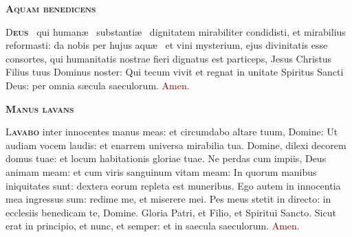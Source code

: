 \documentclass[12pt,a4paper]{scrartcl}
\newcommand{\krzyz}{\textcolor{red}{\raisebox{-1mm}{\scalebox{1.5}{\ding{64}}}}}
\begin{document}
\thispagestyle{empty}

\pagecolor{fondpaille}
\color{darkgreen}

\begin{center}

    \begin{minipage}{0.7\linewidth}

        \vspace*{2.7cm}

        \begin{center}
            \scshape\bfseries\Huge
            Aquam benedicens
        \end{center}

        \vspace*{0.1cm}

        \LARGE\justify

        \lettrine[lines=3]{\color{Maroon}D}{\bfseries\color{Maroon}eus}
        \krzyz~qui human\ae~ substanti\ae~ dignitatem mirabiliter condidisti, et
        mirabilius reformasti: da nobis per hujus aqu\ae~ et vini mysterium,
        ejus divinitatis esse consortes, qui humanitatis nostrae fieri dignatus
        est particeps, Jesus Christus Filius tuus Dominus noster: Qui tecum
        vivit et regnat in unitate Spiritus Sancti Deus: per omnia s\ae cula
        saeculorum. \textcolor{Maroon}{Amen.}

        \vspace*{0.1cm}

        \begin{center}
            \scshape\bfseries\Huge
            Manus lavans
        \end{center}

        \vspace*{0.1cm}

        \LARGE\justify

        \lettrine[lines=3]{\color{Maroon}L}{\bfseries\color{Maroon}avabo} inter
        innocentes manus meas: et circumdabo altare tuum, Domine: Ut audiam
        vocem laudis: et enarrem universa mirabilia tua. Domine, dilexi decorem
        domus tuae: et locum habitationis gloriae tuae. Ne perdas cum impiis,
        Deus animam meam: et cum viris sanguinum vitam meam: In quorum manibus
        iniquitates sunt: dextera eorum repleta est muneribus. Ego autem in
        innocentia mea ingressus sum: redime me, et miserere mei. Pes meus
        stetit in directo: in ecclesiis benedicam te, Domine. Gloria Patri, et
        Filio, et Spiritui Sancto. Sicut erat in principio, et nunc, et semper:
        et in saecula saeculorum. \textcolor{Maroon}{Amen.}
    \end{minipage}
\end{center}

\vspace*{1cm}
\end{document}
